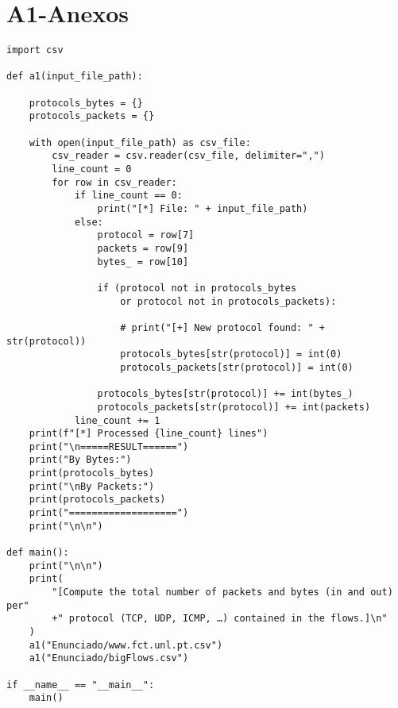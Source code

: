 \appendix
\chapter{A1-Anexos}
\begin{lstlisting}
import csv

def a1(input_file_path):

    protocols_bytes = {}
    protocols_packets = {}

    with open(input_file_path) as csv_file:
        csv_reader = csv.reader(csv_file, delimiter=",")
        line_count = 0
        for row in csv_reader:
            if line_count == 0:
                print("[*] File: " + input_file_path)
            else:
                protocol = row[7]
                packets = row[9]
                bytes_ = row[10]

                if (protocol not in protocols_bytes 
                    or protocol not in protocols_packets):
                    
                    # print("[+] New protocol found: " + str(protocol))
                    protocols_bytes[str(protocol)] = int(0)
                    protocols_packets[str(protocol)] = int(0)

                protocols_bytes[str(protocol)] += int(bytes_)
                protocols_packets[str(protocol)] += int(packets)
            line_count += 1
    print(f"[*] Processed {line_count} lines")
    print("\n=====RESULT======")
    print("By Bytes:")
    print(protocols_bytes)
    print("\nBy Packets:")
    print(protocols_packets)
    print("===================")
    print("\n\n")

def main():
    print("\n\n")
    print(
        "[Compute the total number of packets and bytes (in and out) per"
        +" protocol (TCP, UDP, ICMP, …) contained in the flows.]\n"
    )
    a1("Enunciado/www.fct.unl.pt.csv")
    a1("Enunciado/bigFlows.csv")

if __name__ == "__main__":
    main()

\end{lstlisting}


